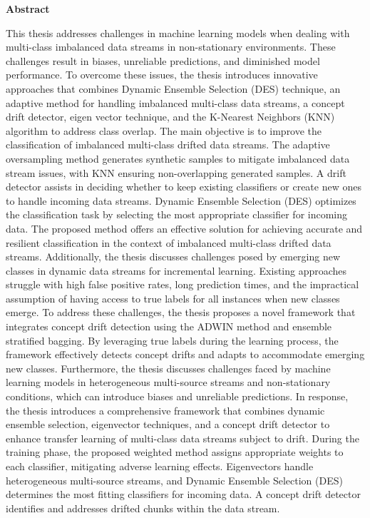 




\begin{alwayssingle} \pagestyle{empty}\begin{center}
    \vspace*{1.5cm}
    {\Large \bfseries  Abstract}
  \end{center}      %
    This thesis addresses challenges in machine learning models when dealing with multi-class imbalanced data streams in non-stationary environments. These challenges result in biases, unreliable predictions, and diminished model performance. To overcome these issues, the thesis introduces innovative approaches that combines Dynamic Ensemble Selection (DES) technique, an adaptive method for handling imbalanced multi-class data streams, a concept drift detector, eigen vector technique, and the K-Nearest Neighbors (KNN) algorithm to address class overlap.
    The main objective is to improve the classification of imbalanced multi-class drifted data streams. The adaptive oversampling method generates synthetic samples to mitigate imbalanced data stream issues, with KNN ensuring non-overlapping generated samples. A drift detector assists in deciding whether to keep existing classifiers or create new ones to handle incoming data streams. Dynamic Ensemble Selection (DES) optimizes the classification task by selecting the most appropriate classifier for incoming data. The proposed method offers an effective solution for achieving accurate and resilient classification in the context of imbalanced multi-class drifted data streams. 
    Additionally, the thesis discusses challenges posed by emerging new classes in dynamic data streams for incremental learning. Existing approaches struggle with high false positive rates, long prediction times, and the impractical assumption of having access to true labels for all instances when new classes emerge. To address these challenges, the thesis proposes a novel framework that integrates concept drift detection using the ADWIN method and ensemble stratified bagging. By leveraging true labels during the learning process, the framework effectively detects concept drifts and adapts to accommodate emerging new classes. 
    Furthermore, the thesis discusses challenges faced by machine learning models in heterogeneous multi-source streams and non-stationary conditions, which can introduce biases and unreliable predictions. In response, the thesis introduces a comprehensive framework that combines dynamic ensemble selection, eigenvector techniques, and a concept drift detector to enhance transfer learning of multi-class data streams subject to drift. During the training phase, the proposed weighted method assigns appropriate weights to each classifier, mitigating adverse learning effects. Eigenvectors handle heterogeneous multi-source streams, and Dynamic Ensemble Selection (DES) determines the most fitting classifiers for incoming data. A concept drift detector identifies and addresses drifted chunks within the data stream.

\end{alwayssingle}
